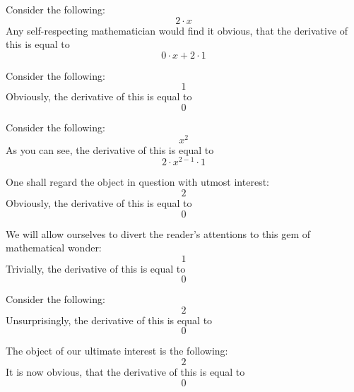 \documentclass{article}
\begin{document}
Consider the following:
\begin{equation}
2 \cdot x 
\end{equation}
Any self-respecting mathematician would find it obvious, that the derivative of this is equal to
\begin{equation}
0 \cdot x + 2 \cdot 1 
\end{equation}

Consider the following:
\begin{equation}
1 
\end{equation}
Obviously, the derivative of this is equal to
\begin{equation}
0 
\end{equation}

Consider the following:
\begin{equation}
x ^{2 } 
\end{equation}
As you can see, the derivative of this is equal to
\begin{equation}
2 \cdot x ^{2 - 1 } \cdot 1 
\end{equation}

One shall regard the object in question with utmost interest:
\begin{equation}
2 
\end{equation}
Obviously, the derivative of this is equal to
\begin{equation}
0 
\end{equation}

We will allow ourselves to divert the reader's attentions to this gem of mathematical wonder:
\begin{equation}
1 
\end{equation}
Trivially, the derivative of this is equal to
\begin{equation}
0 
\end{equation}

Consider the following:
\begin{equation}
2 
\end{equation}
Unsurprisingly, the derivative of this is equal to
\begin{equation}
0 
\end{equation}

The object of our ultimate interest is the following:
\begin{equation}
2 
\end{equation}
It is now obvious, that the derivative of this is equal to
\begin{equation}
0 
\end{equation}
\end{document}
